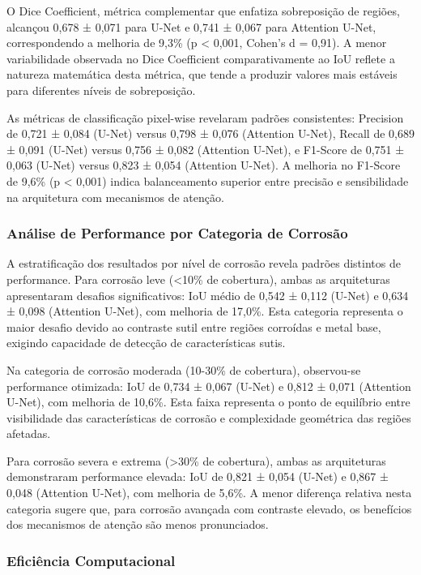 \documentclass[12pt,a4paper,twoside]{article}
\begin{document}
O Dice Coefficient, métrica complementar que enfatiza sobreposição de regiões, alcançou 0,678 ± 0,071 para U-Net e 0,741 ± 0,067 para Attention U-Net, correspondendo a melhoria de 9,3\% (p < 0,001, Cohen's d = 0,91). A menor variabilidade observada no Dice Coefficient comparativamente ao IoU reflete a natureza matemática desta métrica, que tende a produzir valores mais estáveis para diferentes níveis de sobreposição.

As métricas de classificação pixel-wise revelaram padrões consistentes: Precision de 0,721 ± 0,084 (U-Net) versus 0,798 ± 0,076 (Attention U-Net), Recall de 0,689 ± 0,091 (U-Net) versus 0,756 ± 0,082 (Attention U-Net), e F1-Score de 0,751 ± 0,063 (U-Net) versus 0,823 ± 0,054 (Attention U-Net). A melhoria no F1-Score de 9,6\% (p < 0,001) indica balanceamento superior entre precisão e sensibilidade na arquitetura com mecanismos de atenção.

\subsubsection{Análise de Performance por Categoria de Corrosão}

A estratificação dos resultados por nível de corrosão revela padrões distintos de performance. Para corrosão leve (<10\% de cobertura), ambas as arquiteturas apresentaram desafios significativos: IoU médio de 0,542 ± 0,112 (U-Net) e 0,634 ± 0,098 (Attention U-Net), com melhoria de 17,0\%. Esta categoria representa o maior desafio devido ao contraste sutil entre regiões corroídas e metal base, exigindo capacidade de detecção de características sutis.

Na categoria de corrosão moderada (10-30\% de cobertura), observou-se performance otimizada: IoU de 0,734 ± 0,067 (U-Net) e 0,812 ± 0,071 (Attention U-Net), com melhoria de 10,6\%. Esta faixa representa o ponto de equilíbrio entre visibilidade das características de corrosão e complexidade geométrica das regiões afetadas.

Para corrosão severa e extrema (>30\% de cobertura), ambas as arquiteturas demonstraram performance elevada: IoU de 0,821 ± 0,054 (U-Net) e 0,867 ± 0,048 (Attention U-Net), com melhoria de 5,6\%. A menor diferença relativa nesta categoria sugere que, para corrosão avançada com contraste elevado, os benefícios dos mecanismos de atenção são menos pronunciados.

\subsubsection{Eficiência Computacional}
\end{document}
